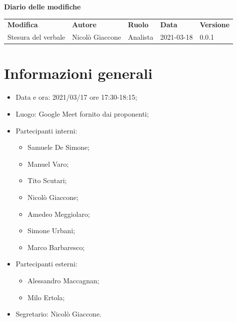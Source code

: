 \documentclass[a4paper]{article}
\begin{document}
    \begin{center}
        \textbf{\Large Diario delle modifiche}\\
        \vspace{10px}
        \begin{table}[h!]
        \centering
        \renewcommand{\arraystretch}{1.8}
        \begin{tabular}{p{150px} p{90px} p{50px} p{60px} p{45px}}
            \rowcolor{logo!70} \textbf{Modifica} & \textbf{Autore} & \textbf{Ruolo} & \textbf{Data} & \textbf{Versione}\\
            Stesura del verbale & Nicolò Giaccone & Analista & 2021-03-18 & 0.0.1 \\    
        \end{tabular}
    \end{table}
    \end{center}

    \newpage
    \tableofcontents
    \newpage
    \section{Informazioni generali}
    \begin{itemize}
        \item Data e ora: 2021/03/17 ore 17:30-18:15;
        \item Luogo: Google Meet fornito dai proponenti;
        \item Partecipanti interni:  
        \begin{itemize}
            \item  Samuele De Simone;
            \item  Manuel Varo;
            \item  Tito Scutari;
            \item  Nicolò Giaccone;
            \item  Amedeo Meggiolaro;
            \item  Simone Urbani;
            \item  Marco Barbaresco;
        \end{itemize}
        \item Partecipanti esterni: 
        \begin{itemize}
            \item Alessandro Maccagnan; 
            \item Milo Ertola;
        \end{itemize} 
        \item Segretario: Nicolò Giaccone.
    \end{itemize}
\end{document}
